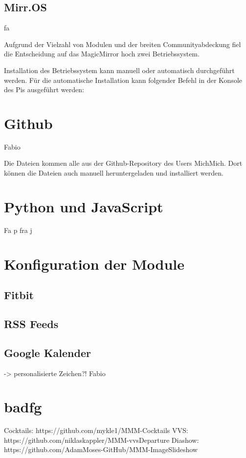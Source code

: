 \documentclass[12pt,a4paper]{report}
\begin{document}
\subsection*{Mirr.OS}
fa


Aufgrund der Vielzahl von Modulen und der breiten Communityabdeckung fiel die Entscheidung auf das MagicMirror hoch zwei Betriebssystem. 


Installation des Betriebssystem kann manuell oder automatisch durchgeführt werden. 
Für die automatische Installation kann folgender Befehl in der Konsole des Pis ausgeführt werden:

\section{Github}

Fabio


Die Dateien kommen alle aus der Github-Repository des Users MichMich. Dort können die Dateien auch manuell heruntergeladen und installiert werden. 
\section{Python und JavaScript}
Fa p fra j
\section{Konfiguration der Module}
\subsection{Fitbit}
\subsection{RSS Feeds}
\subsection{Google Kalender}
-> personalisierte Zeichen?!
Fabio


\section{badfg}
Cocktails: https://github.com/mykle1/MMM-Cocktails
VVS: https://github.com/niklaskappler/MMM-vvsDeparture
Diashow: https://github.com/AdamMoses-GitHub/MMM-ImageSlideshow
\end{document}
